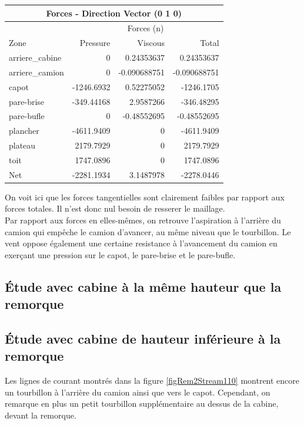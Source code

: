 \begin{center}\begin{tabular}{|l|r r r|}
\hline
\multicolumn{4}{|c|}{Forces - Direction Vector (0 1 0)} \\
\hline
		&   \multicolumn{3}{c|}{Forces (n)} \\
\hline
Zone                &     Pressure    &   Viscous     &   Total      \\
\hline
arriere\_cabine      &     0           &   0.24353637  &   0.24353637  \\ 
arriere\_camion      &     0           &   -0.090688751&   -0.090688751\\ 
capot               &     -1246.6932  &   0.52275052  &   -1246.1705  \\ 
pare-brise          &     -349.44168  &   2.9587266   &   -346.48295  \\ 
pare-bufle          &     0           &   -0.48552695 &   -0.48552695 \\ 
plancher            &     -4611.9409  &   0           &   -4611.9409  \\ 
plateau             &     2179.7929   &   0           &   2179.7929   \\ 
toit                &     1747.0896   &   0           &   1747.0896   \\ 
\hline
\hline
Net                 &     -2281.1934  &   3.1487978   &   -2278.0446  \\ 
\hline
\end{tabular}\end{center}

On voit ici que les forces tangentielles sont clairement faibles par rapport aux forces totales. Il n'est donc nul besoin de resserer le maillage.\\
Par rapport aux forces en elles-mêmes, on retrouve l'aspiration à l'arrière du camion qui empêche le camion d'avancer, au même niveau que le tourbillon. Le vent oppose également une certaine resistance à l'avancement du camion en exerçant une pression sur le capot, le pare-brise et le pare-bufle. 

\subsection{Étude avec cabine à la même hauteur que la remorque}

\subsection{Étude avec cabine de hauteur inférieure à la remorque}
Les lignes de courant montrés dans la figure \ref{figRem2Stream110} montrent encore un tourbillon à l'arrière du camion ainsi que vers le capot. Cependant, on remarque en plus un petit tourbillon supplémentaire au dessus de la cabine, devant la remorque. \\ 

